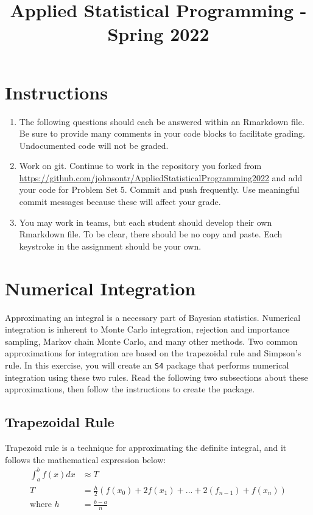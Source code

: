 \documentclass[
]{article}
\title{Applied Statistical Programming - Spring 2022}
\author{}
\date{\vspace{-2.5em}}
\begin{document}
\maketitle

\section*{Instructions}
\begin{enumerate}
  \item The following questions should each be answered within an Rmarkdown file. Be sure to provide many comments in your code blocks to facilitate grading. Undocumented code will not be graded.
  \item Work on git. Continue to work in the repository you forked from \url{https://github.com/johnsontr/AppliedStatisticalProgramming2022} and add your code for Problem Set 5. Commit and push frequently. Use meaningful commit messages because these will affect your grade.
  \item You may work in teams, but each student should develop their own Rmarkdown file. To be clear, there should be no copy and paste. Each keystroke in the assignment should be your own.
\end{enumerate}

\section*{Numerical Integration}

Approximating an integral is a necessary part of Bayesian statistics.
Numerical integration is inherent to Monte Carlo integration, rejection
and importance sampling, Markov chain Monte Carlo, and many other
methods. Two common approximations for integration are based on the
trapezoidal rule and Simpson's rule. In this exercise, you will create
an \texttt{S4} package that performs numerical integration using these
two rules. Read the following two subsections about these
approximations, then follow the instructions to create the package.

\subsection*{Trapezoidal Rule}

Trapezoid rule is a technique for approximating the definite integral,
and it follows the mathematical expression below: \begin{align*} 
 \int_a^b f(x) dx &\approx T\\
T &= \frac{h}{2}(f(x_0) + 2f(x_1) + ... + 2(f_{n-1}) + f(x_n))\\
\text{where } h &= \frac{b-a}{n} 
\end{align*}
\end{document}
